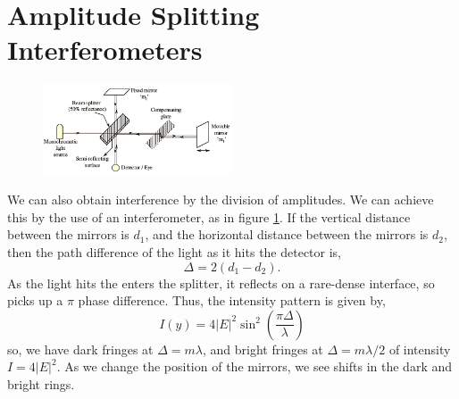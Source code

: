 \documentclass{book}
\begin{document}
{\section{Amplitude Splitting Interferometers}
\begin{figure}[h]
	\centering
	\includegraphics[width=0.5\textwidth]{interferometer.png}
	\caption{}
	\label{fig:interferometer}
\end{figure}\noindent
We can also obtain interference by the division of amplitudes. We can achieve this by the use of an interferometer, as in figure \ref{fig:interferometer}. If the vertical distance between the mirrors is $d_1$, and the horizontal distance between the mirrors is $d_2$, then the path difference of the light as it hits the detector is,
\begin{equation}
	\Delta = 2(d_1 - d_2).
\end{equation}
As the light hits the enters the splitter, it reflects on a rare-dense interface, so picks up a $\pi$ phase difference. Thus, the intensity pattern is given by,
\begin{equation}
	I(y) = 4|E|^2\sin^2\left(\frac{\pi\Delta}{\lambda}\right)
\end{equation}
so, we have dark fringes at $\Delta = m \lambda$, and bright fringes at $\Delta = m\lambda/2$ of intensity $I = 4|E|^2$. As we change the position of the mirrors, we see shifts in the dark and bright rings. 
}
\end{document}
